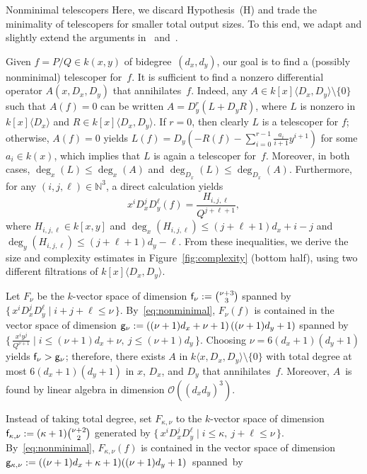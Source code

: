 \documentclass{sig-alt-full}
\newcommand{\bigO}{{\mathcal{O}}}
\newcommand{\bN}{\mathbb{N}}
\begin{document}
\begin{section}{Nonminimal telescopers}\label{sec:nonminimal-order}
Here, we discard Hypothesis~(H) and trade the minimality of telescopers for smaller total output sizes.
To this end, we adapt and slightly extend the arguments
in~\cite{Lipshitz1988} and~\cite[\S\,3]{BCLSS2007}.

\medskip
Given $f=P/Q\in k(x, y)$ of bidegree~$(d_x, d_y)$, our goal is to
find a (possibly nonminimal) telescoper for~$f$.
It is sufficient to
find a nonzero differential operator $A(x,D_x,D_y)$ that annihilates~$f$.
Indeed, any $A\in k[x]\langle D_x, D_y\rangle \setminus \{0\}$ such that
$A(f)=0$ can be written $A= D_y^r(L + D_y R)$, where $L$ is
nonzero in $k[x]\langle D_x \rangle$ and $R\in k[x]\langle D_x, D_y\rangle$.
If $r=0$, then clearly $L$ is a telescoper for $f$; otherwise, $A(f)=0$ yields
$L(f) = D_y(-R(f)-\sum_{i=0}^{r-1}\frac{a_i}{i+1}y^{i+1})$
for some $a_i\in k(x)$,
which implies that $L$ is again a telescoper for~$f$. Moreover,
in both cases, $\deg_x(L)\le \deg_x(A)$ and $\deg_{D_x}(L)\le \deg_{D_x}(A)$.
Furthermore, for any $(i, j, \ell) \in \bN^3$, a direct calculation yields
\begin{equation}\label{eq:nonminimal}
x^iD_x^jD_y^{\ell}(f)=\frac{H_{i,j,\ell}}{Q^{j+\ell+1}},
\end{equation}
where $H_{i, j, \ell}\in k[x, y]$ and $\deg_x(H_{i,j,\ell})\leq
(j+\ell+1)d_x+i-j$ and $\deg_y(H_{i,j,\ell})\leq
(j+\ell+1)d_y-\ell$.  From these inequalities, we derive
the size and complexity estimates in Figure~\ref{fig:complexity} (bottom half), using
two different filtrations of $k[x]\langle D_x, D_y\rangle$.

\medskip{}
Let $F_\nu$ be the $k$-vector space
of dimension ${\sf f}_\nu:=\binom{\nu+3}{3}$
spanned by $\{\,x^iD_x^jD_y^{\ell} \mid i+j+\ell
\leq \nu\,\}$.
By~\eqref{eq:nonminimal}, $F_\nu(f)$ is contained
in the vector space of dimension
${\sf g}_\nu:=\left((\nu+1) d_x+\nu+1\right)\left((\nu+1) d_y+1\right)$
spanned by
$\bigl\{\,\frac{x^i y^j}{Q^{\nu+1}} \mid i \le (\nu+1) d_x+\nu, \ j \le (\nu+1) d_y\,\bigr\}$.
Choosing
$\nu=6(d_x+1)(d_y+1)$ yields ${\sf f}_\nu > {\sf g}_\nu$;
therefore, there exists $A$ in $k\langle x, D_x, D_y\rangle
\setminus \{0\}$ with total degree at most
$6(d_x+1)(d_y+1)$ in $x$,
$D_x$, and $D_y$ that annihilates~$f$.
Moreover, $A$~is found by
linear algebra in dimension
$\bigO((d_x d_y)^3)$.

\smallskip{}
Instead of taking total
degree, set $F_{\kappa, \nu}$ to the $k$-vector space of dimension
${\sf f}_{\kappa,\nu}:=(\kappa+1)\binom{\nu+2}{2}$
generated by
$\{\, x^iD_x^jD_y^{\ell} \mid i\le \kappa, \ j+\ell
\leq \nu\,\}$.
By~\eqref{eq:nonminimal},  $F_{\kappa, \nu}(f)$ is contained
in the vector space of dimension
\hbox{${\sf g}_{\kappa,\nu}:=((\nu+1) d_x+\kappa+1)((\nu+1) d_y+1)$ spanned by}



\end{section}
\end{document}
